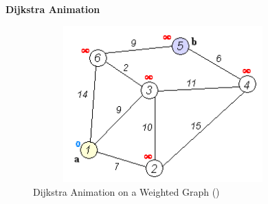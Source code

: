 \textbf{{\Large{Dijkstra Animation}}}\newline
\begin{figure}[h]
    \centering
\includegraphics[width=10cm, height=6cm]{DijkstraAnimation.gif}
 \caption{Dijkstra Animation on a Weighted Graph (\href{https://upload.wikimedia.org/wikipedia/commons/5/57/Dijkstra_Animation.gif}{})}
    \label{fig:DijkstraAnimation}
\end{figure}
\\
\newline

